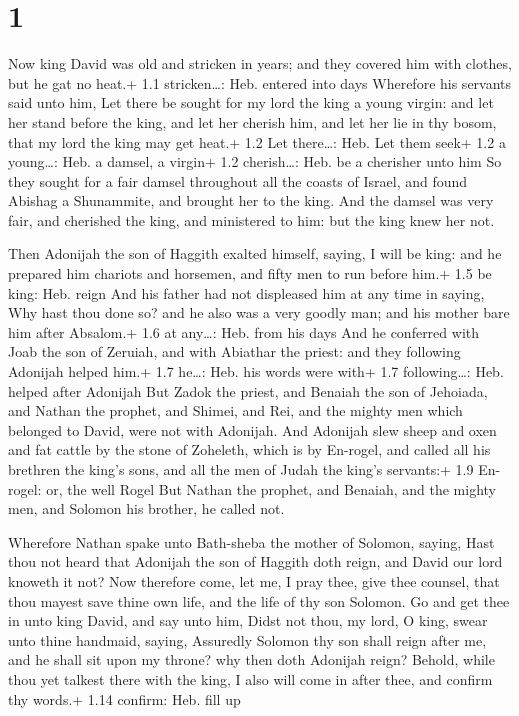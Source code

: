\hypertarget{section}{%
\section{1}\label{section}}

 Now king David was old and stricken in years; and they
covered him with clothes, but he gat no heat.+ 1.1 stricken\ldots: Heb.
entered into days  Wherefore his servants said unto him, Let
there be sought for my lord the king a young virgin: and let her stand
before the king, and let her cherish him, and let her lie in thy bosom,
that my lord the king may get heat.+ 1.2 Let there\ldots: Heb. Let them
seek+ 1.2 a young\ldots: Heb. a damsel, a virgin+ 1.2 cherish\ldots:
Heb. be a cherisher unto him  So they sought for a fair
damsel throughout all the coasts of Israel, and found Abishag a
Shunammite, and brought her to the king.  And the damsel was
very fair, and cherished the king, and ministered to him: but the king
knew her not.

 Then Adonijah the son of Haggith exalted himself, saying,
I will be king: and he prepared him chariots and horsemen, and fifty men
to run before him.+ 1.5 be king: Heb. reign  And his father
had not displeased him at any time in saying, Why hast thou done so? and
he also was a very goodly man; and his mother bare him after Absalom.+
1.6 at any\ldots: Heb. from his days  And he conferred with
Joab the son of Zeruiah, and with Abiathar the priest: and they
following Adonijah helped him.+ 1.7 he\ldots: Heb. his words were with+
1.7 following\ldots: Heb. helped after Adonijah  But Zadok
the priest, and Benaiah the son of Jehoiada, and Nathan the prophet, and
Shimei, and Rei, and the mighty men which belonged to David, were not
with Adonijah.  And Adonijah slew sheep and oxen and fat
cattle by the stone of Zoheleth, which is by En-rogel, and called all
his brethren the king's sons, and all the men of Judah the king's
servants:+ 1.9 En-rogel: or, the well Rogel  But Nathan the
prophet, and Benaiah, and the mighty men, and Solomon his brother, he
called not.

 Wherefore Nathan spake unto Bath-sheba the mother of
Solomon, saying, Hast thou not heard that Adonijah the son of Haggith
doth reign, and David our lord knoweth it not?  Now
therefore come, let me, I pray thee, give thee counsel, that thou mayest
save thine own life, and the life of thy son Solomon.  Go
and get thee in unto king David, and say unto him, Didst not thou, my
lord, O king, swear unto thine handmaid, saying, Assuredly Solomon thy
son shall reign after me, and he shall sit upon my throne? why then doth
Adonijah reign?  Behold, while thou yet talkest there with
the king, I also will come in after thee, and confirm thy words.+ 1.14
confirm: Heb. fill up

